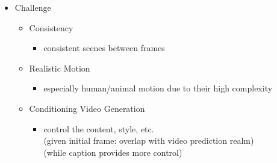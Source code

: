 \begin{itemize}
\begin{itemize}
	\end{itemize}
\item Challenge
	\begin{itemize}
	\item Consistency
		\begin{itemize}
		\item consistent scenes between frames
		\end{itemize}
	\item Realistic Motion
		\begin{itemize}
		\item especially human/animal motion due to their high complexity
		\end{itemize}
	\item Conditioning Video Generation
		\begin{itemize}
		\item control the content, style, etc. \\
		(given initial frame: overlap with video prediction realm) \\
		(while caption provides more control)
		\end{itemize}
	\end{itemize}
\end{itemize}
